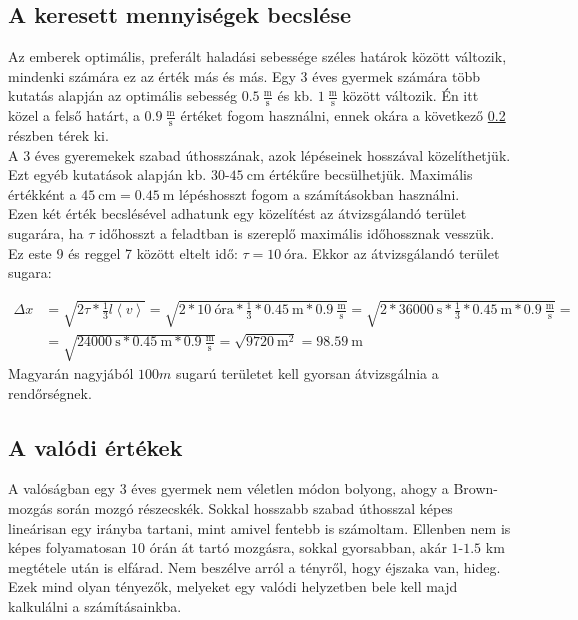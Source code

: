 \subsection{A keresett mennyiségek becslése} \label{sub:3.2}
Az emberek optimális, preferált haladási sebessége széles határok között változik, mindenki számára ez az érték más és más. Egy 3 éves gyermek számára több kutatás alapján az optimális sebesség $0.5\ \frac{\text{m}}{\text{s}}$ és kb. $1\ \frac{\text{m}}{\text{s}}$ között változik\cite{dejaeger2001energy}\cite{larusdottir2011evacuation}\cite{cavagna1983mechanics}. Én itt közel a felső határt, a $0.9\ \frac{\text{m}}{\text{s}}$ értéket fogom használni, ennek okára a következő \ref{sub:3.3} részben térek ki. \\
A 3 éves gyeremekek szabad úthosszának, azok lépéseinek hosszával közelíthetjük. Ezt egyéb kutatások alapján kb. $30$-$45\ \text{cm}$ értékűre becsülhetjük\cite{gill2016relationship}. Maximális értékként a $45\ \text{cm} = 0.45\ \text{m}$ lépéshosszt fogom a számításokban használni.\\
Ezen két érték becslésével adhatunk egy közelítést az átvizsgálandó terület sugarára, ha $\tau$ időhosszt a feladtban is szereplő maximális időhossznak vesszük. Ez este 9 és reggel 7 között eltelt idő: $\tau = 10\ \text{óra}$. Ekkor az átvizsgálandó terület sugara:

\begin{align} \label{eq:3}
    \Delta x
    &=
    \sqrt{2 \tau * \frac{1}{3} l \left< v \right>}
    =
    \sqrt{2 * 10\ \text{óra} * \frac{1}{3} * 0.45\ \text{m} * 0.9\ \frac{\text{m}}{\text{s}}}
    =
    \sqrt{2 * 36000\ \text{s} * \frac{1}{3} * 0.45\ \text{m} * 0.9\ \frac{\text{m}}{\text{s}}}
    = \nonumber \\
    &=
    \sqrt{24000\ \text{s} * 0.45\ \text{m} * 0.9\ \frac{\text{m}}{\text{s}}}
    =
    \sqrt{9720\ \text{m}^{2}}
    =
    \boxed{98.59\ \text{m}}
\end{align}
Magyarán nagyjából $100m$ sugarú területet kell gyorsan átvizsgálnia a rendőrségnek.

\subsection{A valódi értékek} \label{sub:3.3}
A valóságban egy 3 éves gyermek nem véletlen módon bolyong, ahogy a Brown-mozgás során mozgó részecskék. Sokkal hosszabb szabad úthosszal képes lineárisan egy irányba tartani, mint amivel fentebb is számoltam. Ellenben nem is képes folyamatosan $10$ órán át tartó mozgásra, sokkal gyorsabban, akár $1$-$1.5$ km megtétele után is elfárad. Nem beszélve arról a tényről, hogy éjszaka van, hideg. Ezek mind olyan tényezők, melyeket egy valódi helyzetben bele kell majd kalkulálni a számításainkba.